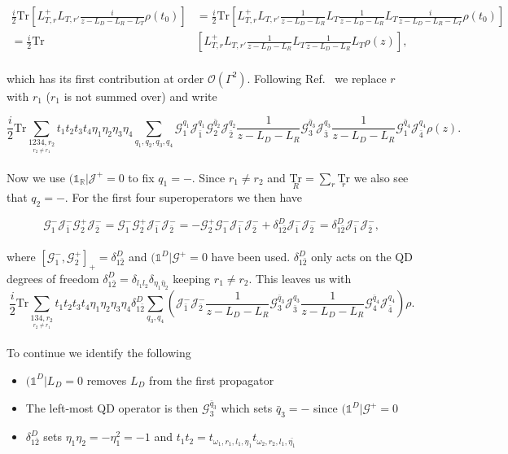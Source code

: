 \documentclass{article}
\newcommand{\bral}[1]{\ensuremath{( #1 |}}
\newcommand{\G}{\ensuremath{\mathcal{G}}}
\newcommand{\J}{\ensuremath{\mathcal{J}}}
\newcommand{\Tr}{\ensuremath{\text{Tr}}}
\newcommand{\Tru}[1]{\ensuremath{\underset{#1}{\text{Tr}}}}
\begin{document}
\begin{equation}
	\begin{split}
   \frac{i}{2}\Tr  \left [ L_{T,r}^+L_{T,r'} \frac{i}{z-L_D-L_R-L_T}\rho(t_0) \right ]  &= \frac{i}{2}\Tr \left [ L_{T,r}^+L_{T,r'} \frac{1}{z-L_D-L_R}L_T\frac{1}{z-L_D-L_R}L_T\frac{i}{z-L_D-L_R-L_T}\rho(t_0) \right ] \\ 
   =\frac{i}{2}\Tr  &\left [ L_{T,r}^+L_{T,r'} \frac{1}{z-L_D-L_R}L_T\frac{1}{z-L_D-L_R}L_T\rho(z) \right ] ,
	   \end{split}
\end{equation}
\\
which has its first contribution at order $\mathcal{O}(\Gamma^2)$. Following Ref.~\cite{gergs2017transport} we replace $r$ with $r_1$ ($r_1$ is not summed over) and write

\begin{equation}
    \frac{i}{2}\Tr \sum_{\underset{r_2\ne r_1}{1234,r_2}}t_1t_2t_3t_4\eta_1\eta_2\eta_3\eta_4 \sum_{q_1, q_2, q_3, q_4}\G^{q_1}_1\J^{q_1}_{\bar{1}}\G^{\bar{q}_2}_2\J^{q_2}_{\bar{2}}\frac{1}{z-L_D-L_R}\G^{\bar{q}_3}_3\J^{q_3}_{\bar{3}}\frac{1}{z-L_D-L_R}\G^{\bar{q}_4}_1\J^{q_4}_{\bar{4}}\rho(z).
\end{equation}
\\
Now we use $\bral{\mathbb{1_R}}\J^+=0$ to fix $q_1=-$. Since $r_1\ne r_2$ and $\Tru{R} = \sum_r \Tru{r}$ we also see that $q_2=-$. For the first four superoperators we then have 

\begin{equation}
    \G^-_1\J^-_{\bar{1}}\G^+_2\J^-_{\bar{2}} = \G^-_1\G^+_2\J^-_{\bar{1}}\J^-_{\bar{2}} = -\G^+_2\G^-_1\J^-_{\bar{1}}\J^-_{\bar{2}} + \delta^D_{1\bar{2}}\J^-_{\bar{1}}\J^-_{\bar{2}} = \delta^D_{1\bar{2}}\J^-_{\bar{1}}\J^-_{\bar{2}},
\end{equation}
\\
where $[\G^-_1, \G^+_2]_+=\delta^D_{1\bar{2}}$ and $\bral{\mathbb{1}^D}\G^+=0$ have been used. $\delta^D_{1\bar{2}}$ only acts on the QD degrees of freedom $\delta^D_{1\bar{2}}=\delta_{l_1l_2}\delta_{\eta_1\bar{\eta}_2}$ keeping $r_1\ne r_2$. This leaves us with
\\
\begin{equation}
    \frac{i}{2}\Tr \sum_{\underset{r_2\ne r_1}{134,r_2 }}t_1t_2t_3t_4\eta_1\eta_2\eta_3\eta_4 \delta^D_{1\bar{2}}\sum_{q_3, q_4}\left( \J^-_{\bar{1}}\J^-_{\bar{2}} \frac{1}{z-L_D-L_R}\G^{\bar{q}_3}_3\J^{q_3}_{\bar{3}}\frac{1}{z-L_D-L_R}\G^{\bar{q}_4}_4\J^{q_4}_{\bar{4}} \right )\rho.
\end{equation}
\\
To continue we identify the following
\begin{itemize}
	\item $\bral{\mathbb{1}^D}L_D=0$ removes $L_D$ from the first propagator
	\item The left-most QD operator is then $\G^{\bar{q}_3}_3$ which sets $\bar{q}_3=-$ since $\bral{\mathbb{1}^D}\G^+=0$
	\item $\delta^D_{1\bar{2}}$ sets $\eta_1\eta_2=-\eta_1^2=-1$ and $t_1t_2=t_{\omega_1, r_1, l_1, \eta_1}t_{\omega_2, r_2, l_1, \bar{\eta_1}}$
 \end{itemize}
\end{document}
